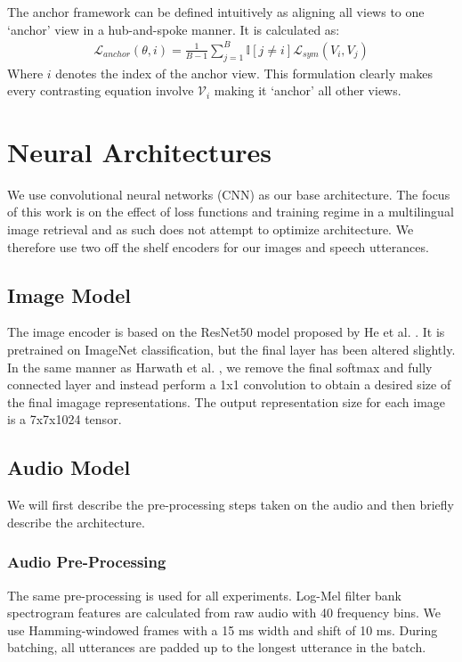 The anchor framework can be defined intuitively as aligning all views to one `anchor' view in a hub-and-spoke manner.
It is calculated as:
\begin{align*}
    \mathcal{L}_{anchor}(\theta, i) = \frac{1}{B-1}\sum_{j=1}^{B} \mathbb{I}[j\neq i] \mathcal{L}_{sym}(V_i, V_j)
\end{align*}
Where $i$ denotes the index of the anchor view.
This formulation clearly makes every contrasting equation involve $\mathcal{V}_i$ making it `anchor' all other views.
\section{Neural Architectures}
\label{background:model_architectures}
We use convolutional neural networks (CNN) as our base architecture. 
The focus of this work is on the effect of loss functions and training regime in a multilingual image retrieval and as such does not attempt to optimize architecture.
We therefore use two off the shelf encoders for our images and speech utterances.
\subsection{Image Model}
The image encoder is based on the ResNet50 model proposed by He et al. \cite{he2016deep}.
It is pretrained on ImageNet classification, but the final layer has been altered slightly.
In the same manner as Harwath et al. \cite{harwath2019learning}, we remove the final softmax and fully connected layer and instead perform a 1x1 convolution to obtain a desired size of the final imagage representations.
The output representation size for each image is a 7x7x1024 tensor.
\subsection{Audio Model}
\label{chapter:background|section:audio_model}
We will first describe the pre-processing steps taken on the audio and then briefly describe the architecture.
\subsubsection{Audio Pre-Processing}
The same pre-processing is used for all experiments.
Log-Mel filter bank spectrogram features are calculated from raw audio with 40 frequency bins.
We use Hamming-windowed frames with a 15 ms width and shift of 10 ms.
During batching, all utterances are padded up to the longest utterance in the batch.
